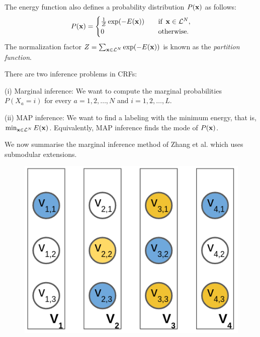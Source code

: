 The energy function also defines a probability distribution $P({\bf x})$ as follows:
\begin{equation}
    P({\bf x}) =
    \begin{cases}
        \frac{1}{\mathcal{Z}} \exp(-E({\bf x})) & \quad \text{if} \enskip {\bf x} \in {\mathcal L}^N,\\
       0  & \quad \text{otherwise}. \\
    \end{cases}
\label{eq:crf_prob_distrib}
\end{equation}
The normalization factor $Z = \sum_{{\bf x} \in {\mathcal L}^N} \exp(-E({\bf x}))$ is known as the {\it partition function}. 

 There are two inference problems in CRFs: 

(i) Marginal inference: We want to compute the marginal probabilities $P(X_a = i)$ for every $a = 1, 2, \dots, N$ and $i = 1, 2, \dots, L$.

(ii) MAP inference: We want to find a labeling with the minimum energy, that is, $\min_{{\bf x} \in {\mathcal L}^N} E({\bf x})$. Equivalently, MAP inference finds the mode of $P({\bf x})$.

\label{sec:review}
We now summarise the marginal inference method of Zhang et al. \citep{zhang2015higher} which
uses submodular extensions.

\begin{figure}
\centering
\includegraphics[scale = 0.30]{./figures/1_of_L.png}
\label{fig:encoding}
\end{figure}

